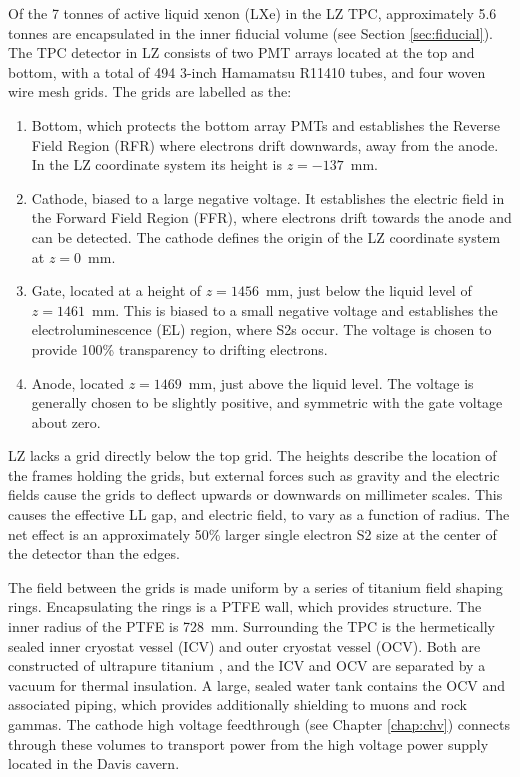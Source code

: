 Of the 7 tonnes of active liquid xenon (LXe) in the LZ TPC, approximately 5.6 tonnes are encapsulated in the inner fiducial volume (see Section \ref{sec:fiducial}).
The TPC detector in LZ consists of two PMT arrays located at the top and bottom, with a total of 494 3-inch Hamamatsu R11410\cite{noauthor_photomultiplier_2021} tubes, and four woven wire mesh grids.
The grids are labelled as the:
\begin{enumerate}
    \item Bottom, which protects the bottom array PMTs and establishes the Reverse Field Region (RFR) where electrons drift downwards, away from the anode.
    In the LZ coordinate system its height is $z=-137$~mm.
    \item Cathode, biased to a large negative voltage. It establishes the electric field in the Forward Field Region (FFR), where electrons drift towards the anode and can be detected. The cathode defines the origin of the LZ coordinate system at $z=0$~mm.
    \item Gate, located at a height of $z=1456$~mm, just below the liquid level of $z=1461$~mm. This is biased to a small negative voltage and establishes the electroluminescence (EL) region, where S2s occur. The voltage is chosen to provide 100\% transparency to drifting electrons.
    \item Anode, located $z=1469$~mm, just above the liquid level. The voltage is generally chosen to be slightly positive, and symmetric with the gate voltage about zero.
\end{enumerate}

LZ lacks a grid directly below the top grid.
The heights describe the location of the frames holding the grids, but external forces such as gravity and the electric fields cause the grids to deflect upwards or downwards on millimeter scales.
This causes the effective LL gap, and electric field, to vary as a function of radius.
The net effect is an approximately 50\% larger single electron S2 size at the center of the detector than the edges.

The field between the grids is made uniform by a series of titanium field shaping rings.
Encapsulating the rings is a PTFE wall, which provides structure.
The  inner radius of the PTFE is 728~mm.
Surrounding the TPC is the hermetically sealed inner cryostat vessel (ICV) and outer cryostat vessel (OCV).
Both are constructed of ultrapure titanium \cite{akerib_identification_2017}, and the ICV and OCV are separated by a vacuum for thermal insulation.
A large, sealed water tank contains the OCV and associated piping, which provides additionally shielding to muons and rock gammas.
The cathode high voltage feedthrough (see Chapter \ref{chap:chv}) connects through these volumes to transport power from the high voltage power supply located in the Davis cavern.


